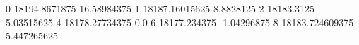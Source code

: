 0 18194.8671875 16.58984375
1 18187.16015625 8.8828125
2 18183.3125 5.03515625
4 18178.27734375 0.0
6 18177.234375 -1.04296875
8 18183.724609375 5.447265625

